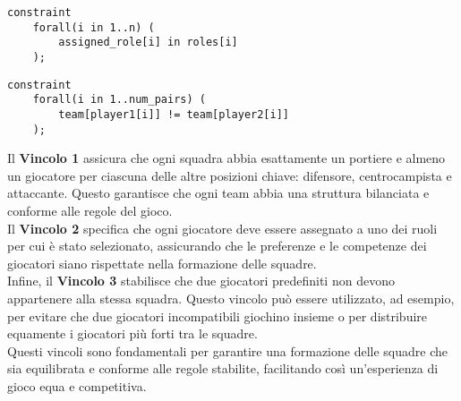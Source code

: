 \documentclass{article}
\begin{document}
\begin{multicols*}{2}
\begin{lstlisting}[style=minizinc, caption={Vincolo 2 Minizinc}, label={lst:minizinc_vincolo2}]
% Ogni giocatore deve essere assegnato a uno dei suoi ruoli scelti
constraint
    forall(i in 1..n) (
        assigned_role[i] in roles[i]
    );
\end{lstlisting}

\begin{lstlisting}[style=minizinc, caption={Vincolo 3 Minizinc}, label={lst:minizinc_vincolo3}]
    constraint
    forall(i in 1..num_pairs) (
        team[player1[i]] != team[player2[i]]
    );
\end{lstlisting}
Il \textbf{Vincolo 1} assicura che ogni squadra abbia esattamente un portiere e almeno un giocatore per ciascuna delle altre posizioni chiave: difensore, centrocampista e attaccante. Questo garantisce che ogni team abbia una struttura bilanciata e conforme alle regole del gioco.
\\
Il \textbf{Vincolo 2} specifica che ogni giocatore deve essere assegnato a uno dei ruoli per cui è stato selezionato, assicurando che le preferenze e le competenze dei giocatori siano rispettate nella formazione delle squadre.
\\
Infine, il \textbf{Vincolo 3} stabilisce che due giocatori predefiniti non devono appartenere alla stessa squadra. Questo vincolo può essere utilizzato, ad esempio, per evitare che due giocatori incompatibili giochino insieme o per distribuire equamente i giocatori più forti tra le squadre.
\\
Questi vincoli sono fondamentali per garantire una formazione delle squadre che sia equilibrata e conforme alle regole stabilite, facilitando così un'esperienza di gioco equa e competitiva.


\end{multicols*}
\end{document}
